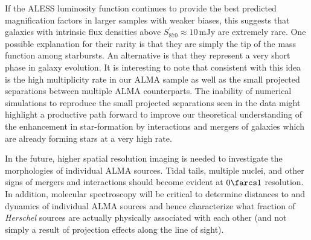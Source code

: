 \documentclass[iop]{emulateapj}
\begin{document}
If the ALESS luminosity function continues to provide the best predicted
magnification factors in larger samples with weaker biases, this suggests that
galaxies with intrinsic flux densities above $S_{870}^\prime \approx 10\,$mJy
are extremely rare.  One possible explanation for their rarity is that they are
simply the tip of the mass function among starbursts.  An alternative is that
they represent a very short phase in galaxy evolution.  It is interesting to
note that consistent with this idea is the high multiplicity rate in our ALMA
sample as well as the small projected separations between multiple ALMA
counterparts.  The inability of numerical simulations to reproduce the small
projected separations seen in the data might highlight a productive path
forward to improve our theoretical understanding of the enhancement in
star-formation by interactions and mergers of galaxies which are already
forming stars at a very high rate.

In the future, higher spatial resolution imaging is needed to investigate the
morphologies of individual ALMA sources.  Tidal tails, multiple nuclei, and
other signs of mergers and interactions should become evident at $0\farcs1$
resolution.  In addition, molecular spectroscopy will be critical to determine
distances to and dynamics of individual ALMA sources and hence characterize
what fraction of {\it Herschel} sources are actually physically associated with
each other (and not simply a result of projection effects along the line of
sight).  %
\end{document}
